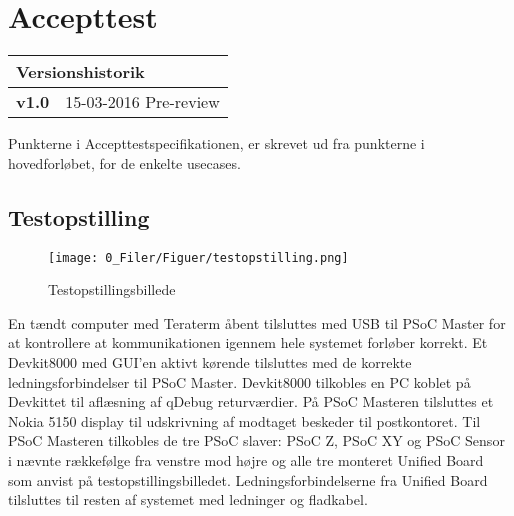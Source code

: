 \chapter{Accepttest}

\begin{table}[!htbp] \centering
\begin{tabular}{|p{2cm}|p{8cm}|}
	\hline
		\multicolumn{2}{|l|}{Versionshistorik} \\\hline
		\textbf{v1.0} &15-03-2016 Pre-review\\\hline
	\end{tabular}
\end{table}

Punkterne i Accepttestspecifikationen, er skrevet ud fra punkterne i hovedforløbet, for de enkelte usecases.

\section{Testopstilling}

\begin{figure}[H]
\centering
\texttt{[image: 0\_Filer/Figuer/testopstilling.png]}
\caption{Testopstillingsbillede}
\label{fig:testopstilling}
\end{figure}

En tændt computer med Teraterm åbent tilsluttes med USB til PSoC Master for at kontrollere at kommunikationen igennem hele systemet forløber korrekt. Et Devkit8000 med GUI’en aktivt kørende tilsluttes med de korrekte ledningsforbindelser til PSoC Master. Devkit8000 tilkobles en PC koblet på Devkittet til aflæsning af qDebug returværdier. På PSoC Masteren tilsluttes et Nokia 5150 display til udskrivning af modtaget beskeder til postkontoret. Til PSoC Masteren tilkobles de tre PSoC slaver: PSoC Z, PSoC XY og PSoC Sensor i nævnte rækkefølge fra venstre mod højre og alle tre monteret Unified Board som anvist på testopstillingsbilledet. Ledningsforbindelserne fra Unified Board tilsluttes til resten af systemet med ledninger og fladkabel.















%

%